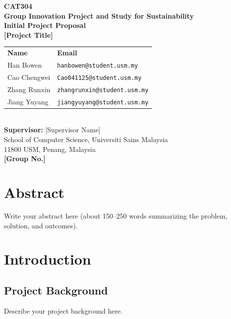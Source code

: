 \documentclass[12pt,a4paper]{article}
\begin{document}
\begin{titlepage}
\centering
\vspace*{1cm} %

{\LARGE \textbf{CAT304}}\\[1.5cm]
{\Large \textbf{Group Innovation Project and Study for Sustainability}}\\[1.5cm]
{\large \textbf{Initial Project Proposal}}\\[2cm]

{\Large \textbf{[Project Title]}}\\[2.5cm]

\begin{tabular}{@{} l l @{}}  %
\textbf{Name} & \textbf{Email} \\
Han Bowen & \texttt{hanbowen@student.usm.my} \\
Cao Chengwei & \texttt{Cao041125@student.usm.my} \\
Zhang Runxin & \texttt{zhangrunxin@student.usm.my} \\
Jiang Yuyang & \texttt{jiangyuyang@student.usm.my} \\
\end{tabular}\\[2cm]

\textbf{Supervisor:} [Supervisor Name]\\[1.5cm]

School of Computer Science, Universiti Sains Malaysia\\
11800 USM, Penang, Malaysia\\[1.5cm]

\textbf{[Group No.]}\\[3cm]

\vfill %
\end{titlepage}

\newpage
\tableofcontents
\newpage

\section*{Abstract}
Write your abstract here (about 150–250 words summarizing the problem, solution, and outcomes).

\section{Introduction}
\subsection{Project Background}
Describe your project background here.
\end{document}
